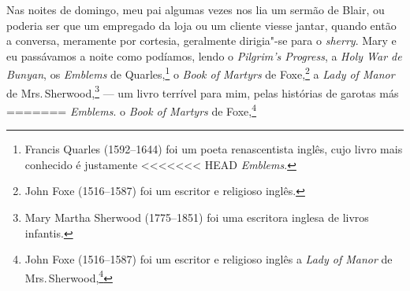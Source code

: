 {{{{{{{{{{{{{{{{{{{{Nas noites de domingo, meu pai algumas vezes nos lia um sermão de Blair,
ou poderia ser que um empregado da loja ou um cliente viesse jantar,
quando então a conversa, meramente por cortesia, geralmente dirigia"-se
para o \textit{sherry}. Mary e eu passávamos a noite como podíamos, lendo
o \textit{Pilgrim's Progress}, a \textit{Holy War de Bunyan}, os
\textit{Emblems} de Quarles,\footnote{Francis Quarles (1592--1644) foi um poeta
  renascentista inglês, cujo livro mais conhecido é justamente
<<<<<<< HEAD
  \textit{Emblems}.} o \textit{Book of Martyrs} de
Foxe,\footnote{John Foxe (1516--1587) foi um escritor e religioso inglês.} a \textit{Lady of Manor} de Mrs.\,Sherwood,\footnote{Mary Martha
  Sherwood (1775--1851) foi uma escritora inglesa de livros infantis.} --- um livro terrível para mim, pelas histórias de garotas más
=======
  \textit{Emblems}.  o \textit{Book of Martyrs} de
Foxe,\footnote{John Foxe (1516--1587) foi um escritor e religioso inglês  a \textit{Lady of Manor} de Mrs.\,Sherwood,\footnote{Mary Martha
  Sherwood (1775--1851) foi uma escritora inglesa de livros infantis  --- um livro terrível para mim, pelas histórias de garotas más
>>>>>>> 7ef31cc2a6d5603f856fee4c85bc83700040648c
que tinham ido a bailes e morrido imediatamente de febre, --- e o
\textit{Henry Milner} de Mrs.\,Sherwood, --- este mais tarde, --- o
\textit{Youth's Magazine}, \textit{Alfred Campbell the Young
Pilgrim}, e, embora mais como uma indulgência profana, permitida devido
à dureza de nossos corações, a \textit{Natural History} de
Bingley.\footnote{Reverendo William Bingley (1774--1821) foi um naturalista e
<<<<<<< HEAD
  escritor inglês.} Nenhum de nós se interessava por
=======
  escritor inglês  Nenhum de nós se interessava por
>>>>>>> 7ef31cc2a6d5603f856fee4c85bc83700040648c
cantar hinos ou salmos, e éramos demasiadamente honestos para considerar
a música sacra como simples divertimento, além do fato de que não a
achávamos particularmente divertida.

}}}}}}}}}}}}}}}}}}}}}}
